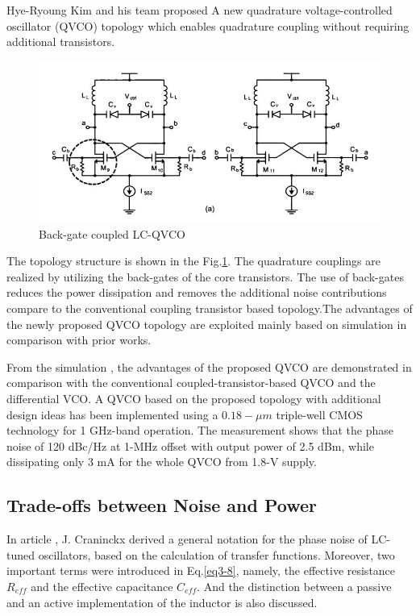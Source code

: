 \documentclass[conference]{IEEEtran}
\begin{document}
Hye-Ryoung Kim and his team \cite{b4} proposed A new quadrature voltage-controlled oscillator (QVCO) topology which enables quadrature coupling without requiring additional transistors. 

\begin{figure}[!h]
\centerline{\includegraphics[scale=0.30]{fig/pic3-6.jpg}}
\caption{Back-gate coupled LC-QVCO\cite{b4}}
\label{fig3-6}
\end{figure}

The topology structure is shown in the Fig.\ref{fig3-6}. The quadrature couplings are realized by utilizing the back-gates of the core transistors. The use of back-gates reduces the power dissipation and removes the additional noise contributions compare to the conventional coupling transistor based topology.The advantages of the newly proposed QVCO topology are exploited mainly based on simulation in comparison with prior works.

From the simulation \cite{b4}, the advantages of the proposed QVCO are demonstrated in comparison with the conventional coupled-transistor-based QVCO and the differential VCO. A QVCO based on the proposed topology with additional design ideas has been implemented using a $0.18-\mu m$ triple-well CMOS technology for 1 GHz-band operation. The measurement shows that the phase noise of 120 dBc/Hz at 1-MHz offset with output power of 2.5 dBm, while dissipating only 3 mA for the whole QVCO from 1.8-V supply.

\subsection{Trade-offs between Noise and Power}

In article \cite{b6}, J. Craninckx derived a general notation for the phase noise of LC-tuned oscillators, based on the calculation of transfer functions. Moreover, two important terms were introduced in Eq.\ref{eq3-8}, namely, the effective resistance $R_{eff}$ and the effective capacitance $C_{eff}$. And the distinction between a passive and an active implementation of the inductor is also discussed.
\end{document}
